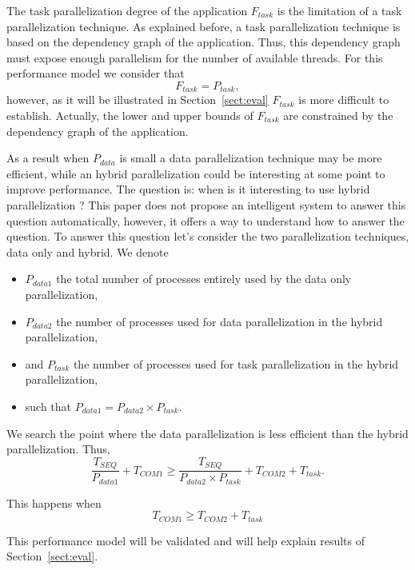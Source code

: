 The task parallelization degree of the application $F_{task}$ is the limitation of a task parallelization technique. As explained before, a task parallelization technique is based on the dependency graph of the application. Thus, this dependency graph must expose enough parallelism for the number of available threads. For this performance model we consider that 
\begin{equation*}
F_{task} = P_{task}, 
\end{equation*}
however, as it will be illustrated in Section~\ref{sect:eval} $F_{task}$ is more difficult to establish. Actually, the lower and upper bounds of $F_{task}$ are constrained by the dependency graph of the application.

\medskip
As a result when $P_{data}$ is small a data parallelization technique may be more efficient, while an hybrid parallelization could be interesting at some point to improve performance. The question is: when is it interesting to use hybrid parallelization ? This paper does not propose an intelligent system to answer this question automatically, however, it offers a way to understand how to answer the question. To answer this question let's consider the two parallelization techniques, data only and hybrid. We denote
\begin{itemize}
\item $P_{data1}$ the total number of processes entirely used by the data only parallelization,
\item $P_{data2}$ the number of processes used for data parallelization in the hybrid parallelization,
\item and $P_{task}$ the number of processes used for task parallelization in the hybrid parallelization,
\item such that $P_{data1} = P_{data2} \times P_{task}$.
\end{itemize}

We search the point where the data parallelization is less efficient than the hybrid parallelization. Thus, 
\begin{equation*}
\frac{T_{SEQ}}{P_{data1}} + T_{COM1} \geq \frac{T_{SEQ}}{P_{data2} \times P_{task}} + T_{COM2} + T_{task}.
\end{equation*}

This happens when
\begin{equation}
T_{COM1} \geq T_{COM2} + T_{task}
\label{eq:hyb}
\end{equation}

This performance model will be validated and will help explain results of Section~\ref{sect:eval}.